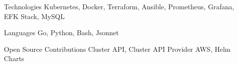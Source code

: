 


\begin{cvskills}


\cvskill
{Technologies} %
{Kubernetes, Docker, Terraform, Ansible, Prometheus, Grafana, EFK Stack, MySQL} %


\cvskill
{Languages} %
{Go, Python, Bash, Jsonnet}


\cvskill
{Open Source Contributions} %
{Cluster API, Cluster API Provider AWS, Helm Charts}

\end{cvskills}
